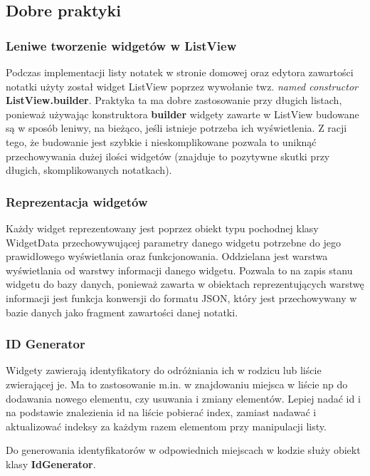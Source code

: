 \subsection{Dobre praktyki}

\subsubsection{Leniwe tworzenie widgetów w ListView}

Podczas implementacji listy notatek w stronie domowej oraz edytora zawartości notatki użyty został widget ListView poprzez wywołanie twz. \textit{named constructor} \textbf{ListView.builder}. Praktyka ta ma dobre zastosowanie przy długich listach, ponieważ używając konstruktora \textbf{builder} widgety zawarte w ListView budowane są w sposób leniwy, na bieżąco, jeśli istnieje potrzeba ich wyświetlenia. Z racji tego, że budowanie jest szybkie i nieskomplikowane pozwala to uniknąć przechowywania dużej ilości widgetów (znajduje to pozytywne skutki przy długich, skomplikowanych notatkach).

\subsubsection{Reprezentacja widgetów}

Każdy widget reprezentowany jest poprzez obiekt typu pochodnej klasy WidgetData przechowywującej parametry danego widgetu potrzebne do jego prawidłowego wyświetlania oraz funkcjonowania. Oddzielana jest warstwa wyświetlania od warstwy informacji danego widgetu. Pozwala to na zapis stanu widgetu do bazy danych, ponieważ zawarta w obiektach reprezentujących warstwę informacji jest funkcja konwersji do formatu JSON, który jest przechowywany w bazie danych jako fragment zawartości danej notatki.

\subsubsection{ID Generator}

Widgety zawierają identyfikatory do odróżniania ich w rodzicu lub liście zwierającej je. Ma to zastosowanie m.in. w znajdowaniu miejsca w liście np do dodawania nowego elementu, czy usuwania i zmiany elementów. Lepiej nadać id i na podstawie znalezienia id na liście pobierać index, zamiast nadawać i aktualizować indeksy za każdym razem elementom przy manipulacji listy.

Do generowania identyfikatorów w odpowiednich miejscach w kodzie służy obiekt klasy \textbf{IdGenerator}.


